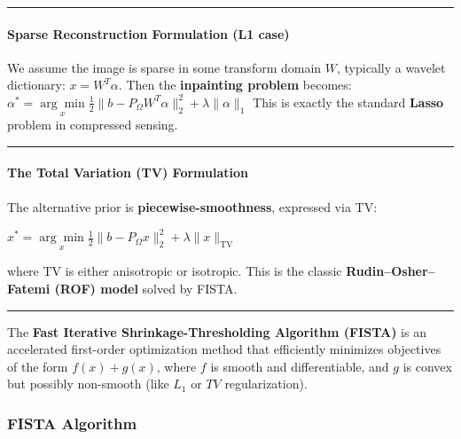 \documentclass[11pt]{article}
\begin{document}
\begin{center}\rule{0.5\linewidth}{0.5pt}\end{center}

\hypertarget{sparse-reconstruction-formulation-l1-case}{%
\paragraph{\texorpdfstring{\textbf{Sparse Reconstruction Formulation (L1
case)}}{Sparse Reconstruction Formulation (L1 case)}}\label{sparse-reconstruction-formulation-l1-case}}

We assume the image is sparse in some transform domain \(W\), typically
a wavelet dictionary: \(x = W^{T}\alpha\). Then the \textbf{inpainting
problem} becomes:
\(\boxed{\alpha^* = \underset{x}{\arg\min} \frac{1}{2}\| b - P_\Omega W^T \alpha \|_2^2 + \lambda \|\alpha\|_1}\)
This is exactly the standard \textbf{Lasso} problem in compressed
sensing.

\begin{center}\rule{0.5\linewidth}{0.5pt}\end{center}

\hypertarget{the-total-variation-tv-formulation}{%
\paragraph{\texorpdfstring{\textbf{The Total Variation (TV)
Formulation}}{The Total Variation (TV) Formulation}}\label{the-total-variation-tv-formulation}}

The alternative prior is \textbf{piecewise-smoothness}, expressed via
TV:

\(\boxed{ x^* = \underset{x}{\arg\min} \frac{1}{2} \| b - P_\Omega x \|_2^2 + \lambda \|x\|_{\text{TV}} }\)

where TV is either anisotropic or isotropic. This is the classic
\textbf{Rudin--Osher--Fatemi (ROF) model} solved by FISTA.

\begin{center}\rule{0.5\linewidth}{0.5pt}\end{center}

The \textbf{Fast Iterative Shrinkage-Thresholding Algorithm (FISTA)} is
an accelerated first-order optimization method that efficiently
minimizes objectives of the form \(f(x) + g(x)\), where \(f\) is smooth
and differentiable, and \(g\) is convex but possibly non-smooth (like
\(L_1\) or \(TV\) regularization).

\hypertarget{fista-algorithm}{%
\subsubsection{\texorpdfstring{\textbf{FISTA
Algorithm}}{FISTA Algorithm}}\label{fista-algorithm}}
\end{document}

